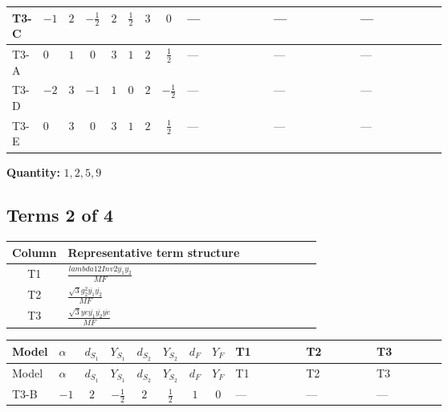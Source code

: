 \documentclass[8pt]{article}
\begin{document}
\begin{landscape}
\begin{longtable}{@{}llcccccc >{\raggedright\arraybackslash}p{0.21\linewidth} >{\raggedright\arraybackslash}p{0.21\linewidth} >{\raggedright\arraybackslash}p{0.21\linewidth}@{}}
\midrule
T3-C & $-1$ & $2$ & $-\frac{1}{2}$ & $2$ & $\frac{1}{2}$ & $3$ & $0$ & --- & --- & --- \\
\midrule
T3-A & $0$ & $1$ & $0$ & $3$ & $1$ & $2$ & $\frac{1}{2}$ & --- & --- & --- \\
\midrule
T3-D & $-2$ & $3$ & $-1$ & $1$ & $0$ & $2$ & $-\frac{1}{2}$ & --- & --- & --- \\
\midrule
T3-E & $0$ & $3$ & $0$ & $3$ & $1$ & $2$ & $\frac{1}{2}$ & --- & --- & --- \\
\midrule
\bottomrule
\end{longtable}
\clearpage
\noindent\textbf{Quantity: }$\mathrm{1,2,5,9}$\par\smallskip
\subsection*{Terms 2 of 4}
\begin{center}
\begin{tabular}{@{}c >{\raggedright\arraybackslash}p{0.82\linewidth}@{}}
\toprule
Column & Representative term structure \\
\midrule
T1 & \(\displaystyle \frac{lambda12Inv2 \overline{y_{1}} \overline{y_{2}}}{MF}\) \\
\midrule
T2 & \(\displaystyle \frac{\sqrt{3} g_{2}^{2} \overline{y_{1}} \overline{y_{2}}}{MF}\) \\
\midrule
T3 & \(\displaystyle \frac{\sqrt{3} ye \overline{y_{1}} \overline{y_{2}} \overline{ye}}{MF}\) \\
\midrule
\bottomrule
\end{tabular}
\end{center}
\smallskip
\tiny
\begin{longtable}{@{}llcccccc >{\raggedright\arraybackslash}p{0.21\linewidth} >{\raggedright\arraybackslash}p{0.21\linewidth} >{\raggedright\arraybackslash}p{0.21\linewidth}@{}}
\toprule
Model & $\alpha$ & $d_{S_1}$ & $Y_{S_1}$ & $d_{S_2}$ & $Y_{S_2}$ & $d_F$ & $Y_F$ & T1 & T2 & T3 \\
\midrule
\endfirsthead
\toprule
Model & $\alpha$ & $d_{S_1}$ & $Y_{S_1}$ & $d_{S_2}$ & $Y_{S_2}$ & $d_F$ & $Y_F$ & T1 & T2 & T3 \\
\midrule
\endhead
T3-B & $-1$ & $2$ & $-\frac{1}{2}$ & $2$ & $\frac{1}{2}$ & $1$ & $0$ & --- & --- & --- \\
\midrule

\end{longtable}
\end{landscape}
\end{document}
